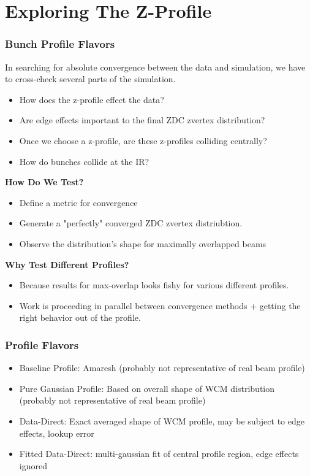 \section{Exploring The Z-Profile}
\label{ch:ExploringZProfile}

\begin{frame}
	\frametitle{Bunch Profile Flavors}
	In searching for absolute convergence between the data and simulation, we have to cross-check several parts of the simulation.
	\begin{itemize}
			\item How does the z-profile effect the data?
			\item Are edge effects important to the final ZDC zvertex distribution?
			\item Once we choose a z-profile, are these z-profiles colliding centrally?
			\item How do bunches collide at the IR?
	\end{itemize}
  \textbf{How Do We Test?}
	\begin{itemize}
			\item Define a metric for convergence
			\item Generate a "perfectly" converged ZDC zvertex distriubtion.
			\item Observe the distribution's shape for maximally overlapped beams
	\end{itemize}
	\textbf{Why Test Different Profiles?}
	\begin{itemize}
		\item Because results for max-overlap looks fishy for various different profiles.
		\item Work is proceeding in parallel between convergence methods + getting the right behavior out of the profile.
	\end{itemize}
\end{frame}

\begin{frame}
\frametitle{Profile Flavors}
\begin{itemize}
  \item Baseline Profile: Amaresh (probably not representative of real beam profile)
	\item Pure Gaussian Profile: Based on overall shape of WCM distribution (probably not representative of real beam profile)
	\item Data-Direct: Exact averaged shape of WCM profile, may be subject to edge effects, lookup error
	\item Fitted Data-Direct: multi-gaussian fit of central profile region, edge effects ignored
\end{itemize}
\end{frame}

